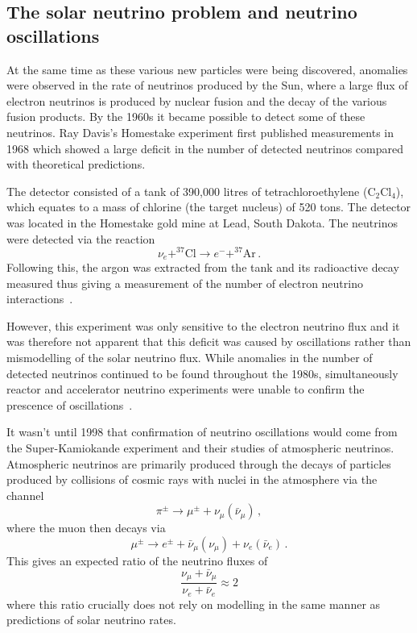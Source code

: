 \subsection{The solar neutrino problem and neutrino oscillations}
\label{sec:theory:history:oscillations}

At the same time as these various new particles were being discovered, anomalies were observed in the rate of neutrinos produced by the Sun, where a large flux of electron neutrinos is produced by nuclear fusion and the decay of the various fusion products. 
By the 1960s it became possible to detect some of these neutrinos.
Ray Davis's Homestake experiment first published measurements in 1968 which showed a large deficit in the number of detected neutrinos compared with theoretical predictions.

The detector consisted of a tank of 390,000 litres of tetrachloroethylene ($\text{C}_{2}\text{Cl}_{4}$), which equates to a mass of chlorine (the target nucleus) of 520 tons.
The detector was located in the Homestake gold mine at Lead, South Dakota.
The neutrinos were detected via the reaction
\begin{equation}
  \nu_{e} + ^{37}\text{Cl} \rightarrow e^{-} + ^{37}\text{Ar} \, .
\end{equation}
Following this, the argon was extracted from the tank and its radioactive decay measured thus giving a measurement of the number of electron neutrino interactions~\cite{rayDavis}.

However, this experiment was only sensitive to the electron neutrino flux and it was therefore not apparent that this deficit was caused by oscillations rather than mismodelling of the solar neutrino flux.
While anomalies in the number of detected neutrinos continued to be found throughout the 1980s, simultaneously reactor and accelerator neutrino experiments were unable to confirm the prescence of oscillations~\cite{neutrinoHistory}.

It wasn't until 1998 that confirmation of neutrino oscillations would come from the Super-Kamiokande experiment and their studies of atmospheric neutrinos.
Atmospheric neutrinos are primarily produced through the decays of particles produced by collisions of cosmic rays with nuclei in the atmosphere via the channel
\begin{equation}
  \pi^{\pm} \rightarrow \mu^{\pm} + \nu_{\mu}(\bar{\nu}_{\mu}) \, , 
\end{equation}
where the muon then decays via
\begin{equation}
  \mu^{\pm} \rightarrow e^{\pm} + \bar{\nu}_{\mu}(\nu_{\mu}) + \nu_{e}(\bar{\nu}_{e}) \, .
\end{equation}
This gives an expected ratio of the neutrino fluxes of
\begin{equation}
  \frac{\nu_{\mu} + \bar{\nu}_{\mu}}{\nu_{e} + \bar{\nu}_{e}} \approx 2
\end{equation}
where this ratio crucially does not rely on modelling in the same manner as predictions of solar neutrino rates.


